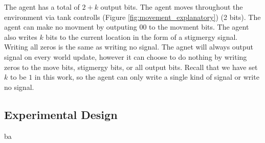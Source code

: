 

The agent has a total of $2+k$ output bits. The agent moves throughout the environment via tank controlls (Figure \ref{fig:movement_explanatory}) (2 bits). The agent can make no movment by outputing $00$ to the movment bits. The agent also writes $k$ bits to the current location in the form of a stigmergy signal. Writing all zeros is the same as writing no signal. The agnet will always output signal on every world update, however it can choose to do nothing by writing zeros to the move bits, stigmergy bits, or all output bits. Recall that we have set $k$ to be $1$ in this work, so the agent can only write a single kind of signal or write no signal.



\subsection{Experimental Design}

ba

